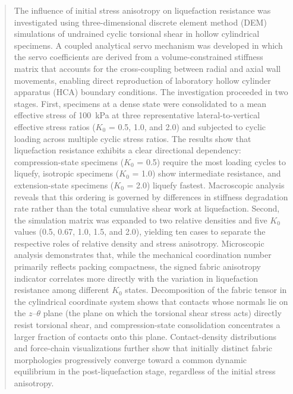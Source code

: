 \documentclass[a4paper,fleqn]{cas-sc}
\newcommand{\Kzero}{\ensuremath{K_0}}
\begin{document}
\begin{abstract}
The influence of initial stress anisotropy on liquefaction resistance was investigated using three-dimensional discrete element method (DEM) simulations of undrained cyclic torsional shear in hollow cylindrical specimens. A coupled analytical servo mechanism was developed in which the servo coefficients are derived from a volume-constrained stiffness matrix that accounts for the cross-coupling between radial and axial wall movements, enabling direct reproduction of laboratory hollow cylinder apparatus (HCA) boundary conditions. The investigation proceeded in two stages. First, specimens at a dense state were consolidated to a mean effective stress of 100~kPa at three representative lateral-to-vertical effective stress ratios (\Kzero{} = 0.5, 1.0, and 2.0) and subjected to cyclic loading across multiple cyclic stress ratios. The results show that liquefaction resistance exhibits a clear directional dependency: compression-state specimens (\Kzero{} = 0.5) require the most loading cycles to liquefy, isotropic specimens (\Kzero{} = 1.0) show intermediate resistance, and extension-state specimens (\Kzero{} = 2.0) liquefy fastest. Macroscopic analysis reveals that this ordering is governed by differences in stiffness degradation rate rather than the total cumulative shear work at liquefaction. Second, the simulation matrix was expanded to two relative densities and five \Kzero{} values (0.5, 0.67, 1.0, 1.5, and 2.0), yielding ten cases to separate the respective roles of relative density and stress anisotropy. Microscopic analysis demonstrates that, while the mechanical coordination number primarily reflects packing compactness, the signed fabric anisotropy indicator correlates more directly with the variation in liquefaction resistance among different \Kzero{} states. Decomposition of the fabric tensor in the cylindrical coordinate system shows that contacts whose normals lie on the $z$--$\theta$ plane (the plane on which the torsional shear stress acts) directly resist torsional shear, and compression-state consolidation concentrates a larger fraction of contacts onto this plane. Contact-density distributions and force-chain visualizations further show that initially distinct fabric morphologies progressively converge toward a common dynamic equilibrium in the post-liquefaction stage, regardless of the initial stress anisotropy.
\end{abstract}
\end{document}
